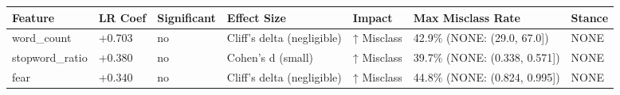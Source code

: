 \begin{tabular}{lllllll}
\toprule
Feature & LR Coef & Significant & Effect Size & Impact & Max Misclass Rate & Stance \\
\midrule
word\_count & +0.703 & no & Cliff's delta (negligible) & ↑ Misclass & 42.9\% (NONE: (29.0, 67.0]) & NONE \\
stopword\_ratio & +0.380 & no & Cohen's d (small) & ↑ Misclass & 39.7\% (NONE: (0.338, 0.571]) & NONE \\
fear & +0.340 & no & Cliff's delta (negligible) & ↑ Misclass & 44.8\% (NONE: (0.824, 0.995]) & NONE \\
\bottomrule
\end{tabular}
